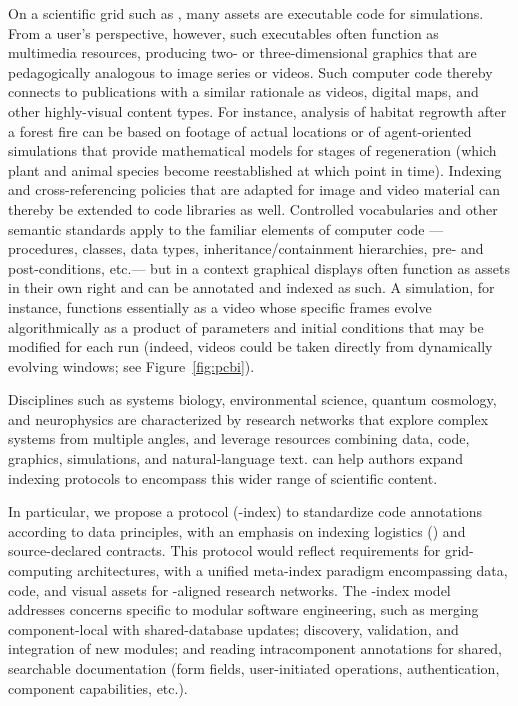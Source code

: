 \documentclass[11pt]{article}
\begin{document}
{{\begin{description}
\pseudoIndent{}  On a scientific grid such as 
\CaBIG{}, many assets are executable code 
for  simulations.  
From a user's perspective, however, such 
executables often function as multimedia 
resources, producing two- or three-dimensional 
graphics that are pedagogically analogous 
to image series or videos.  Such computer code 
thereby connects to publications with a 
similar rationale as videos, digital maps, and 
other highly-visual content types.  For instance, 
analysis of habitat regrowth after a forest 
fire can be based on footage of actual locations 
or of agent-oriented simulations that provide 
mathematical models for stages of regeneration 
(which plant and animal species become reestablished 
at which point in time).  Indexing and cross-referencing 
policies that are adapted for image and video material 
can thereby be extended to code libraries as 
well.  Controlled vocabularies and other semantic 
standards apply to the familiar elements 
of computer code --- procedures, classes, data types, 
inheritance/containment hierarchies, pre- and post-conditions, 
etc.\@ --- but in a  context graphical displays 
often function as assets in their own right and can 
be annotated and indexed as such.  A \ThreeD{} simulation, 
for instance, functions essentially as a video whose 
specific frames evolve algorithmically as a product 
of parameters and initial conditions that may 
be modified for each run (indeed, videos could be 
taken directly from dynamically evolving \GUI{} windows; 
see Figure~\ref{fig:pcbi}).
  
\pseudoIndent{}  Disciplines such as systems biology, 
environmental science, quantum cosmology, and neurophysics 
are characterized by research networks that explore complex 
systems from multiple angles, and leverage resources 
combining data, code, graphics, simulations, and natural-language 
text.  \lPacTk{} can help authors expand indexing protocols 
to encompass this wider range of scientific content.  

\pseudoIndent{}  In particular, we propose a    
protocol (\Scign{}-index) to standardize 
code annotations according to \FAIR{}data principles, 
with an emphasis on indexing \GUI{} logistics () 
and source-declared contracts.  This protocol 
would reflect requirements for grid-computing 
architectures, with a unified meta-index 
paradigm encompassing data, code, and 
visual assets for \FAIR{}-aligned research networks. 
The \Scign{}-index model addresses 
concerns specific to modular software engineering, 
such as merging component-local with shared-database updates; 
discovery, validation, and integration of new modules; 
and reading intracomponent 
annotations for shared, searchable 
documentation (form fields, user-initiated 
operations, authentication, component capabilities, etc.). 
\enlargethispage{25pt}


\end{description}}}
\end{document}
